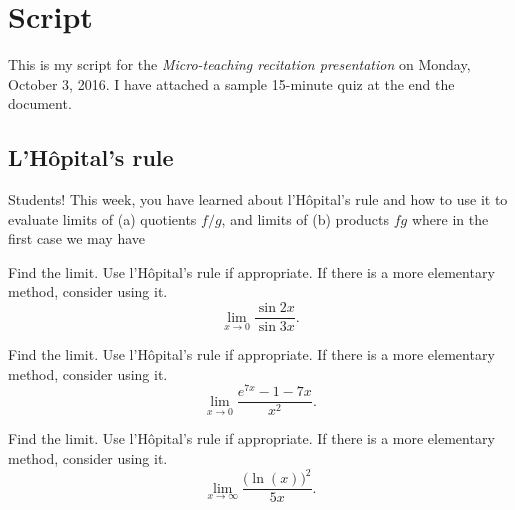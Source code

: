 \documentclass[article,oneside]{memoir}
\begin{document}
%

\author{\textti{\auth}}%
\title{\textti{\tight}}%
\date{\textti{\due}}%

\thispagestyle{empty}
\frontmatter
\maketitle%
\tableofcontents*%
\newpage

\mainmatter
\chapter{Script}
This is my script for the \emph{Micro-teaching recitation presentation} on
Monday, October 3, 2016. I have attached a sample 15-minute quiz at the end
the document.

\section{L'Hôpital's rule}
Students! This week, you have learned about l'Hôpital's rule and how to use
it to evaluate limits of (a) quotients \(f/g\), and limits of (b) products
\(fg\) where in the first case we may have


\begin{problem*}[WebAssign, \# 2]
  Find the limit. Use l'Hôpital's rule if appropriate. If there is a more
  elementary method, consider using it.
  \[
    \lim_{x\to 0}\frac{\sin 2x}{\sin 3x}.
  \]
\end{problem*}
\begin{solution}
\end{solution}

\begin{problem*}[WebAssign, \# 3]
  Find the limit. Use l'Hôpital's rule if appropriate. If there is a more
  elementary method, consider using it.
  \[
    \lim_{x\to 0}\frac{e^{7x}-1-7x}{x^2}.
  \]
\end{problem*}
\begin{solution}
\end{solution}

\begin{problem*}[WebAssign, \# 4]
  Find the limit. Use l'Hôpital's rule if appropriate. If there is a more
  elementary method, consider using it.
  \[
    \lim_{x\to\infty}\frac{\bigl( \ln(x) \bigr)^2}{5x}.
  \]
\end{problem*}
\begin{solution}
\end{solution}
\end{document}
